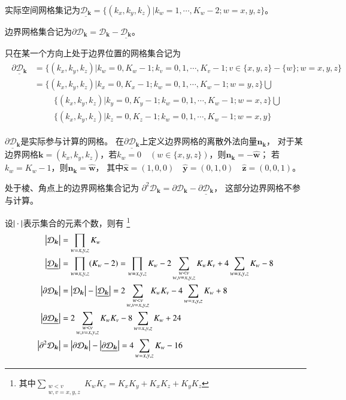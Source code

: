 实际空间网格集记为$\underline{\mathcal{D}_{\bm{k}}}=\big\{(k_x,k_y,k_z)\big|k_w = 1,\cdots,K_w-2 ; w=x,y,z\big\}$。

边界网格集合记为$\partial \mathcal{D}_{\bm{k}}=\mathcal{D}_{\bm{k}} - \underline{\mathcal{D}_{\bm{k}}}$。

只在某一个方向上处于边界位置的网格集合记为
\begin{align}
  \begin{aligned}
  \underline{\partial \mathcal{D}_{\bm{k}}}
  &=\big\{(k_x,k_y,k_z)\big|k_w=0,K_w-1;k_v = 0,1,\cdots,K_v-1 ; v\in\{x,y,z\}-\{w\} ; w=x,y,z\big\}\\
  &=\big\{(k_x,k_y,k_z)\big|k_x=0,K_x-1;k_w = 0,1,\cdots,K_w-1 ; w=y,z\big\}
  \bigcup\\
  &\hspace{1cm}
  \big\{(k_x,k_y,k_z)\big|k_y=0,K_y-1;k_w = 0,1,\cdots,K_w-1 ; w=x,z\big\}
  \bigcup\\
  &\hspace{1cm}
  \big\{(k_x,k_y,k_z)\big|k_z=0,K_z-1;k_w = 0,1,\cdots,K_w-1 ; w=x,y\big\}
  \end{aligned}
\end{align}

$\underline{\partial \mathcal{D}_{\bm{k}}}$是实际参与计算的网格。
在$\underline{\partial \mathcal{D}_{\bm{k}}}$上定义边界网格的离散外法向量$\bm{n}_{\bm{k}}$，
对于某边界网格$\bm{k}=(k_x,k_y,k_z)$，若$k_w=0 \quad (w\in\{x,y,z\})$，则$\bm{n}_{\bm{k}}=-\hat{\bm{w}}$；
若$k_w=K_w-1$，则$\bm{n}_{\bm{k}}=\hat{\bm{w}}$，
其中$\hat{\bm{x}}=(1,0,0) \quad \hat{\bm{y}}=(0,1,0) \quad \hat{\bm{z}}=(0,0,1)$。

处于棱、角点上的边界网格集合记为
$\partial^2 \mathcal{D}_{\bm{k}} = \partial \mathcal{D}_{\bm{k}} - \underline{\partial \mathcal{D}_{\bm{k}}}$，
这部分边界网格不参与计算。

设$\vb{\cdot}$表示集合的元素个数，则有
\footnote{其中$\sum_{ \substack{w<v \\ w,v=x,y,z} } K_wK_v = K_xK_y+K_xK_z+K_yK_z$}
\begin{align}
  \begin{aligned}
    \vb[b]{\mathcal{D}_{\bm{k}}} &= \prod_{w=x,y,z}K_w\\
    \vb[b]{\underline{\mathcal{D}_{\bm{k}}}} &= \prod_{w=x,y,z}(K_w-2)
      = \prod_{w=x,y,z}K_w 
       -2\sum_{ \substack{w<v \\ w,v=x,y,z} } K_wK_v
       +4\sum_{w=x,y,z}K_w
       -8\\
    \vb[b]{\partial \mathcal{D}_{\bm{k}}} 
      &= \vb[b]{\mathcal{D}_{\bm{k}}} - \vb[b]{\underline{\mathcal{D}_{\bm{k}}}}
      = 2\sum_{ \substack{w<v \\ w,v=x,y,z} } K_wK_v
        -4\sum_{w=x,y,z}K_w
        +8  \\
    \vb[b]{\underline{\partial \mathcal{D}_{\bm{k}}}}
      &= 2\sum_{ \substack{w<v \\ w,v=x,y,z} } K_wK_v
        -8\sum_{w=x,y,z}K_w
        +24\\
    \vb[b]{\partial^2 \mathcal{D}_{\bm{k}}}
      &= \vb[b]{\partial \mathcal{D}_{\bm{k}}} - \vb[b]{\underline{\partial \mathcal{D}_{\bm{k}}}}
      =4\sum_{w=x,y,z}K_w - 16
  \end{aligned}
\end{align}


